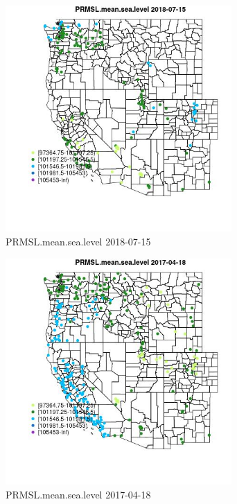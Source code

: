 \begin{figure} 
\centering  
\includegraphics[width=0.77\textwidth]{Code_Outputs/Report_ML_input_PM25_Step4_part_e_de_duplicated_aves_compiled_2019-05-21wNAs_MapObsPRMSLmeansealevel2018-07-15.jpg} 
\caption{\label{fig:Report_ML_input_PM25_Step4_part_e_de_duplicated_aves_compiled_2019-05-21wNAsMapObsPRMSLmeansealevel2018-07-15}PRMSL.mean.sea.level 2018-07-15} 
\end{figure} 
 

\begin{figure} 
\centering  
\includegraphics[width=0.77\textwidth]{Code_Outputs/Report_ML_input_PM25_Step4_part_e_de_duplicated_aves_compiled_2019-05-21wNAs_MapObsPRMSLmeansealevel2017-04-18.jpg} 
\caption{\label{fig:Report_ML_input_PM25_Step4_part_e_de_duplicated_aves_compiled_2019-05-21wNAsMapObsPRMSLmeansealevel2017-04-18}PRMSL.mean.sea.level 2017-04-18} 
\end{figure} 
 

